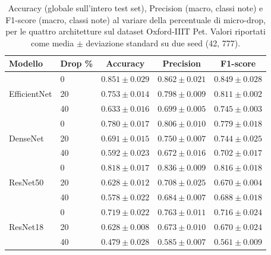\begin{table}[!htb]
    \centering
    \small
    \caption{Accuracy (globale sull'intero test set), Precision (macro, classi note) e F1-score (macro, classi note) al variare della percentuale di micro-drop, per le quattro architetture sul dataset Oxford-IIIT Pet. Valori riportati come media $\pm$ deviazione standard su due seed (42, 777).}
    \label{tab:metriche-pet}
    \begin{tabular}{llccc}
        \toprule
        \textbf{Modello} & \textbf{Drop \%} & \textbf{Accuracy} & \textbf{Precision} & \textbf{F1-score} \\
        \midrule
        \multirow{3}{*}{EfficientNet} & 0  & $0.851 \pm 0.029$ & $0.862 \pm 0.021$ & $0.849 \pm 0.028$ \\
                                       & 20 & $0.753 \pm 0.014$ & $0.798 \pm 0.009$ & $0.811 \pm 0.002$ \\
                                       & 40 & $0.633 \pm 0.016$ & $0.699 \pm 0.005$ & $0.745 \pm 0.003$ \\
        \midrule
        \multirow{3}{*}{DenseNet}     & 0  & $0.780 \pm 0.017$ & $0.806 \pm 0.010$ & $0.779 \pm 0.018$ \\
                                       & 20 & $0.691 \pm 0.015$ & $0.750 \pm 0.007$ & $0.744 \pm 0.025$ \\
                                       & 40 & $0.592 \pm 0.023$ & $0.672 \pm 0.016$ & $0.702 \pm 0.017$ \\
        \midrule
        \multirow{3}{*}{ResNet50}     & 0  & $0.818 \pm 0.017$ & $0.836 \pm 0.009$ & $0.816 \pm 0.018$ \\
                                       & 20 & $0.628 \pm 0.012$ & $0.708 \pm 0.025$ & $0.670 \pm 0.004$ \\
                                       & 40 & $0.578 \pm 0.022$ & $0.684 \pm 0.007$ & $0.688 \pm 0.018$ \\
        \midrule
        \multirow{3}{*}{ResNet18}     & 0  & $0.719 \pm 0.022$ & $0.763 \pm 0.011$ & $0.716 \pm 0.024$ \\
                                       & 20 & $0.628 \pm 0.008$ & $0.673 \pm 0.010$ & $0.670 \pm 0.024$ \\
                                       & 40 & $0.479 \pm 0.028$ & $0.585 \pm 0.007$ & $0.561 \pm 0.009$ \\
        \bottomrule
    \end{tabular}
\end{table}

